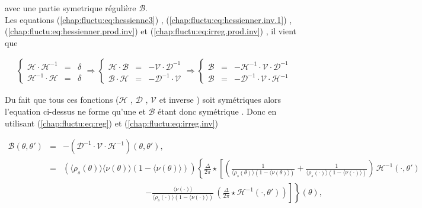 avec une partie symetrique régulière $\mathcal{B}$.\\
Les equations (\ref{chap:fluctu:eq:hessienne3}) , (\ref{chap:fluctu:eq:hessienner.inv.1}) , (\ref{chap:fluctu:eq:hessienner.prod.inv}) et (\ref{chap:fluctu:eq:irreg.prod.inv}) , il vient que 

\begin{eqnarray}
	\left \{\begin{array}{rcl} \mathcal{H}\cdot\mathcal{H}^{-1} & =& \delta \\  \mathcal{H}^{-1}\cdot\mathcal{H} & =& \delta  \end{array} \right.  \Rightarrow	 \left \{\begin{array}{rcl} \mathcal{H}\cdot\mathcal{B} & =& - \mathcal{V}\cdot\mathcal{D}^{-1} \\  \mathcal{B}\cdot\mathcal{H} & =& - \mathcal{D}^{-1}\cdot\mathcal{V}  \end{array} \right. \Rightarrow \left \{\begin{array}{rcl} \mathcal{B} & =& - \mathcal{H}^{-1}\cdot\mathcal{V}\cdot \mathcal{D}^{-1}  \\  \mathcal{B} & =& - \mathcal{D}^{-1}\cdot\mathcal{V}\cdot \mathcal{H}^{-1}  \end{array} \right.	
\end{eqnarray}

Du fait que tous ces fonctions ($\mathcal{H}$ , $\mathcal{D}$ , $\mathcal{V}$ et inverse ) soit symétriques alors l'equation ci-dessus ne forme qu'une et $\mathcal{B}$ étant donc symétrique .
Donc en utilisant (\ref{chap:fluctu:eq:reg}) et (\ref{chap:fluctu:eq:irreg.inv}) 

\begin{eqnarray*}
	\mathcal{B}(\theta , \theta ' )  & = & - (\mathcal{D}^{-1}\cdot\mathcal{V}\cdot \mathcal{H}^{-1})(\theta , \theta') 	,\\
	& = & 	(\langle \rho_s(\theta) \rangle \langle \nu(\theta) \rangle (1 - \langle \nu(\theta) \rangle)) \left \{  \frac{\Delta}{2\pi} \star  \left [ \left (  \frac{1}{\langle \rho_s(\theta)\rangle  (1 - \langle\nu(\theta) \rangle )} +  \frac{1}{\langle\rho_s(\cdot) \rangle (1 - \langle \nu (\cdot ) \rangle )}\right )  \, \mathcal{H}^{-1}( \cdot , \theta ' )   \right. \right .\\
	&&  ~~~~~~~~~~~~~~~~~~~~~~~~~~~~~~~~~~~~~~~~~~~~~\left . \left .   -  \frac{\langle\nu(\cdot)\rangle}{\langle\rho_s(\cdot) \rangle ( 1 - \langle\nu(\cdot)\rangle )}  \, \left ( \frac{\Delta}{2\pi} \star \mathcal{H}^{-1}( \cdot , \theta ' )   \right )  \right ] \right \} (\theta),
\end{eqnarray*}

